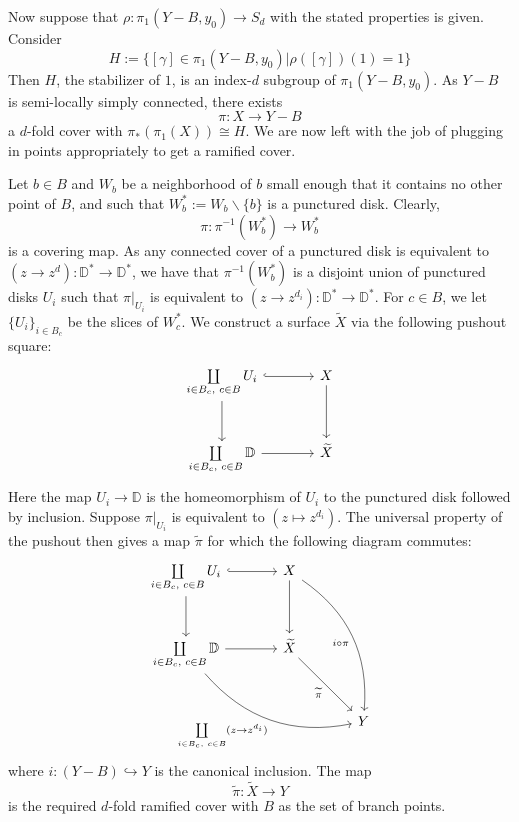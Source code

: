 \documentclass[11pt,a4paper]{article}
\begin{document}
Now suppose that $\rho:\pi_1(Y-B,y_0)\to S_d$ with the stated properties is given. Consider
$$H:= \big\{[\gamma] \in \pi_1(Y-B, y_0)   |  \rho([\gamma])(1) = 1\big\}$$
Then $H$, the stabilizer of $1$, is an index-$d$ subgroup of $\pi_1(Y-B,y_0)$. As $Y-B$ is semi-locally simply connected, there exists
$$\pi: X \rightarrow Y-B$$
a $d$-fold cover with $\pi_*(\pi_1(X)) \cong H$. We are now left with the job of plugging in points appropriately to get a ramified cover.

Let $b\in B$ and $W_b$ be a neighborhood of $b$ small enough that it contains no other point of $B$, and such that $W^*_b:= W_b\backslash \{b\}$ is a punctured disk. Clearly,
$$\pi: \pi^{-1}(W^*_b) \rightarrow W^*_b$$
is a covering map. As any connected cover of a punctured disk is equivalent to $(z\rightarrow z^d): \mathbb{D}^* \rightarrow \mathbb{D}^*$, we have that $\pi^{-1}(W^*_b)$ is a disjoint union of punctured disks $U_i$ such that $\pi\big|_{U_i}$ is equivalent to $(z \rightarrow z^{d_i}):\mathbb{D}^* \rightarrow \mathbb{D}^*$. For $c\in B$, we let $\{U_i\}_{i\in B_c}$ be the slices of $W^*_c$. We construct a surface $\widetilde{X}$ via the following pushout square:
\[\begin{tikzcd}[row sep=large,column sep=large,cells={nodes={font=\normalsize}}]
	{\coprod\limits_{i\in B_c, \hspace{1mm}c\in B} U_i} & X \\
	{\coprod\limits_{i\in B_c, \hspace{1mm}c\in B}\mathbb{D}} & {\widetilde{X}}
	\arrow[from=1-1, to=2-1]
	\arrow[hook, from=1-1, to=1-2]
	\arrow[from=1-2, to=2-2]
	\arrow[from=2-1, to=2-2]
\end{tikzcd}\]
Here the map $U_i\to\mathbb D$ is the homeomorphism of $U_i$ to the punctured disk followed by inclusion. Suppose $\pi\big|_{U_i}$ is equivalent to $(z\mapsto z^{d_i})$. The universal property of the pushout then gives a map $\widetilde\pi$ for which the following diagram commutes:
\[\begin{tikzcd}[row sep=large,column sep=large,cells={nodes={font=\normalsize}}]
	{\coprod\limits_{i\in B_c, \hspace{1mm}c\in B} U_i} & X \\
	{\coprod\limits_{i\in B_c, \hspace{1mm}c\in B}\mathbb{D}} & {\widetilde{X}} \\
	&& Y
	\arrow[from=1-1, to=2-1]
	\arrow[hook, from=1-1, to=1-2]
	\arrow[from=1-2, to=2-2]
	\arrow[from=2-1, to=2-2]
	\arrow["i\circ\pi"', bend left, from=1-2, to=3-3]
	\arrow["{\widetilde{\pi}}"', from=2-2, to=3-3]
	\arrow["{\coprod\limits_{i\in B_c, \hspace{1mm}c\in B}(z\rightarrow z^{d_i})}"', bend right, from=2-1, to=3-3]
\end{tikzcd}\]
where $i: (Y-B) \hookrightarrow Y$ is the canonical inclusion. The map
$$\widetilde{\pi}: \widetilde{X} \rightarrow Y$$
is the required $d$-fold ramified cover with $B$ as the set of branch points.
\end{document}
